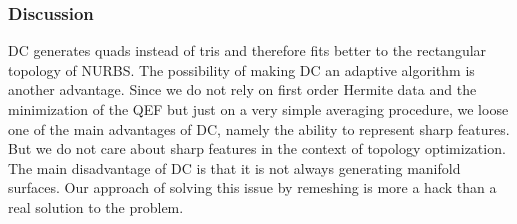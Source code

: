 \subsubsection{Discussion}
\ac{DC} generates \acp{quad} instead of \acp{tri} and therefore fits better to the rectangular topology of \ac{NURBS}. The possibility of making \ac{DC} an adaptive algorithm is another advantage.
Since we do not rely on first order Hermite data and the minimization of the \ac{QEF} but just on a very simple averaging procedure, we loose one of the main advantages of \ac{DC}, namely the ability to represent sharp features. But we do not care about sharp features in the context of topology optimization. 
The main disadvantage of \ac{DC} is that it is not always generating manifold surfaces. Our approach of solving this issue by remeshing is more a hack than a real solution to the problem.
